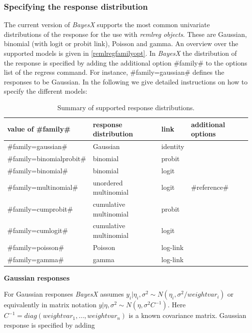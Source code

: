 \subsubsection{Specifying the response distribution}
\label{remlregfamilysyntax}

The current version of {\em BayesX} supports the most common
univariate distributions of the response for the use with {\em
remlreg objects}. These are Gaussian, binomial (with logit or
probit link), Poisson and gamma. An overview over the supported
models is given in \autoref{remlregfamilyopt}. In {\em BayesX} the
distribution of the response is specified by adding the additional
option #family# to the options list of the regress command. For
instance, #family=gaussian# defines the responses to be Gaussian.
In the following we give detailed instructions on how to specify
the different models:

\begin{table}[ht]
\begin{center}
\begin{tabular} {|l|l|l|l|}
 \hline
 value of #family# & response distribution & link & additional options\\
 \hline
 \hline
 #family=gaussian#            & Gaussian              & identity & \\
 \hline
 #family=binomialprobit#      & binomial              & probit & \\
 #family=binomial#            & binomial              & logit & \\
 \hline
 #family=multinomial#         & unordered multinomial & logit & #reference#\\
 \hline
 #family=cumprobit#           & cumulative multinomial   & probit & \\
 #family=cumlogit#            & cumulative multinomial   & logit & \\
 \hline
 #family=poisson#             & Poisson               & log-link & \\
 \hline
 #family=gamma#               & gamma                 & log-link & \\
 \hline
\end{tabular}
{\em \caption {\label{remlregfamilyopt} Summary of supported
response distributions.}}
\end{center}
\end{table}

{\bf Gaussian responses}

For Gaussian responses {\em BayesX} assumes $y_i | \eta_i,\sigma^2
\sim N(\eta_i,\sigma^2/weightvar_i)$ or equivalently in matrix
notation $y | \eta, \sigma^2 \sim N(\eta,\sigma^2C^{-1})$. Here
$C^{-1}=diag(weightvar_1,\dots,weightvar_n)$ is a known covariance
matrix. Gaussian response is specified by adding

